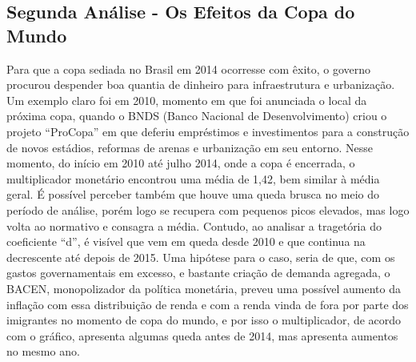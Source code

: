 \documentclass[12pt]{article}
\begin{document}
\subsection*{Segunda Análise - Os Efeitos da Copa do Mundo}

Para que a copa sediada no Brasil em 2014 ocorresse com êxito, o governo
procurou despender boa quantia de dinheiro para infraestrutura e
urbanização. Um exemplo claro foi em 2010, momento em que foi anunciada
o local da próxima copa, quando o BNDS (Banco Nacional de
Desenvolvimento) criou o projeto ``ProCopa'' em que deferiu empréstimos
e investimentos para a construção de novos estádios, reformas de arenas
e urbanização em seu entorno. Nesse momento, do início em 2010 até julho
2014, onde a copa é encerrada, o multiplicador monetário encontrou uma
média de 1,42, bem similar à média geral. É possível perceber também que
houve uma queda brusca no meio do período de análise, porém logo se
recupera com pequenos picos elevados, mas logo volta ao normativo e
consagra a média. Contudo, ao analisar a tragetória do coeficiente
``d'', é visível que vem em queda desde 2010 e que continua na
decrescente até depois de 2015. Uma hipótese para o caso, seria de que,
com os gastos governamentais em excesso, e bastante criação de demanda
agregada, o BACEN, monopolizador da política monetária, preveu uma
possível aumento da inflação com essa distribuição de renda e com a
renda vinda de fora por parte dos imigrantes no momento de copa do
mundo, e por isso o multiplicador, de acordo com o gráfico, apresenta
algumas queda antes de 2014, mas apresenta aumentos no mesmo ano.

\begingroup\fontsize{10}{12}\selectfont
\end{document}
